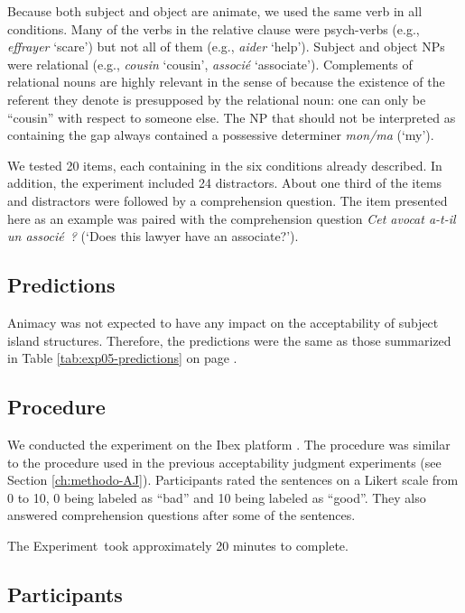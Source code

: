 Because both subject and object are animate, we used the same verb in all conditions. Many of the verbs in the relative clause were psych-verbs (e.g., \emph{effrayer} `scare') but not all of them (e.g., \emph{aider} `help'). Subject and object NPs were relational (e.g., \emph{cousin} `cousin', \emph{associé} `associate'). Complements of relational nouns are highly relevant in the sense of \citet[Section 3.1.2]{Chaves.2012} because the existence of the referent they denote is presupposed by the relational noun: one can only be ``cousin'' with respect to someone else. The NP that should not be interpreted as containing the gap always contained a possessive determiner \emph{mon/ma} (`my').   

We tested 20 items, each containing in the six conditions already described. In addition, the experiment included 24 distractors. 
About one third of the items and distractors were followed by a comprehension question. The item presented here as an example was paired with the comprehension question \emph{Cet avocat a-t-il un associé~?} (`Does this lawyer have an associate?'). 

\subsection{Predictions} 

Animacy was not expected to have any impact on the acceptability of subject island structures. Therefore, the predictions were the same as those summarized in Table \ref{tab:exp05-predictions} on page \pageref{tab:exp05-predictions}.

\subsection{Procedure} 

We conducted the experiment on the Ibex platform \citep{Ibex}. The procedure was similar to the procedure used in the previous acceptability judgment experiments (see Section \ref{ch:methodo-AJ}). Participants rated the sentences on a Likert scale from 0 to 10, 0 being labeled as ``bad'' and 10 being labeled as ``good''. They also answered comprehension questions after some of the sentences.

The Experiment~took approximately 20 minutes to complete. 

\subsection{Participants}

